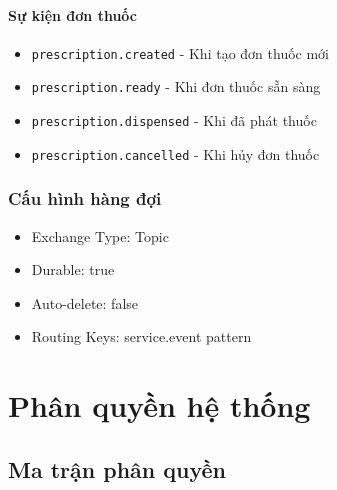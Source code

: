 \documentclass[12pt,a4paper]{report}
\begin{document}
\subsubsection{Sự kiện đơn thuốc}
\begin{itemize}
    \item \texttt{prescription.created} - Khi tạo đơn thuốc mới
    \item \texttt{prescription.ready} - Khi đơn thuốc sẵn sàng
    \item \texttt{prescription.dispensed} - Khi đã phát thuốc
    \item \texttt{prescription.cancelled} - Khi hủy đơn thuốc
\end{itemize}

\subsection{Cấu hình hàng đợi}
\begin{itemize}
    \item Exchange Type: Topic
    \item Durable: true
    \item Auto-delete: false
    \item Routing Keys: service.event pattern
\end{itemize}

\chapter{Phân quyền hệ thống}

\section{Ma trận phân quyền}
\end{document}
